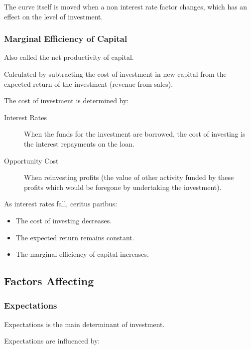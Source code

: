 \documentclass[a4paper,11pt]{article}
\begin{document}
The curve itself is moved when a non interest rate factor changes, which has an
effect on the level of investment.


\subsubsection{Marginal Efficiency of Capital}

Also called the net productivity of capital.

Calculated by subtracting the cost of investment in new capital from the
expected return of the investment (revenue from sales).

The cost of investment is determined by:

\begin{description}
\item [Interest Rates] When the funds for the investment are borrowed, the cost
	of investing is the interest repayments on the loan.
\item [Opportunity Cost] When reinvesting profits (the value of other activity
	funded by these profits which would be foregone by undertaking the
	investment).
\end{description}

As interest rates fall, ceritus paribus:

\begin{itemize}
\item The cost of investing decreases.
\item The expected return remains constant.
\item The marginal efficiency of capital increases.
\end{itemize}


\subsection{Factors Affecting}

\subsubsection{Expectations}

Expectations is the main determinant of investment.

Expectations are influenced by:
\end{document}
